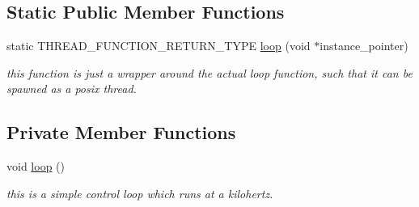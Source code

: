 \subsection*{Static Public Member Functions}
\begin{DoxyCompactItemize}
\item 
static T\+H\+R\+E\+A\+D\+\_\+\+F\+U\+N\+C\+T\+I\+O\+N\+\_\+\+R\+E\+T\+U\+R\+N\+\_\+\+T\+Y\+PE \hyperlink{classLegController_a87bba6942e6f8ba649f595e871d0d379}{loop} (void $\ast$instance\+\_\+pointer)\hypertarget{classLegController_a87bba6942e6f8ba649f595e871d0d379}{}\label{classLegController_a87bba6942e6f8ba649f595e871d0d379}

\begin{DoxyCompactList}\small\item\em this function is just a wrapper around the actual loop function, such that it can be spawned as a posix thread. \end{DoxyCompactList}\end{DoxyCompactItemize}
\subsection*{Private Member Functions}
\begin{DoxyCompactItemize}
\item 
void \hyperlink{classLegController_a00000dd7bbaa4f1e05a9ea16f05e73e8}{loop} ()
\begin{DoxyCompactList}\small\item\em this is a simple control loop which runs at a kilohertz. \end{DoxyCompactList}\end{DoxyCompactItemize}
